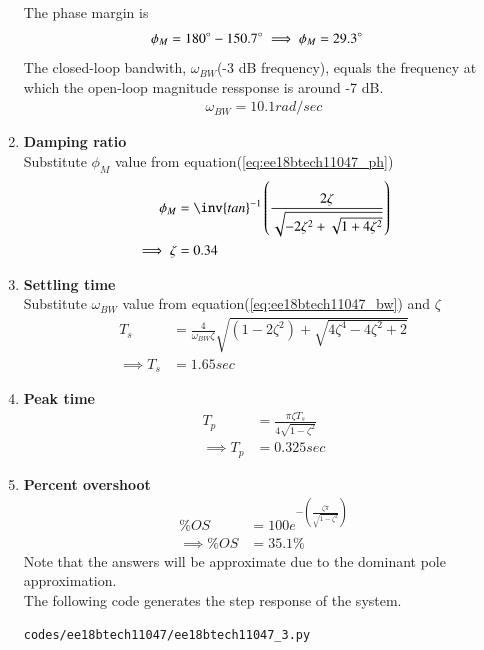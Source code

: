 \begin{enumerate}[label=\thesubsection.\arabic*.,ref=\thesubsection.\theenumi]
The phase margin is 
\begin{align}
\phi_{M} &= 180\degree-150.7\degree \implies \phi_{M} = 29.3\degree \label{eq:ee18btech11047_ph}
\end{align}
The closed-loop bandwith, $\omega_{BW}$(-3 dB frequency), equals the frequency at which the open-loop magnitude ressponse is around -7 dB.
\begin{align}
\omega_{BW} = 10.1  rad/sec \label{eq:ee18btech11047_bw}
\end{align}
\item \textbf{Damping ratio} \\
Substitute $\phi_{M}$ value from equation(\ref{eq:ee18btech11047_ph})
\begin{align}
\phi_{M} &= \inv{tan}^{-1}\brak{\frac{2\zeta}{\sqrt{-2\zeta^{2}+\sqrt{1+4\zeta^{2}}}}}\\
\implies \zeta &= 0.34
\end{align}
\item \textbf{Settling time} \\
Substitute $\omega_{BW}$ value from equation(\ref{eq:ee18btech11047_bw}) and $\zeta$
\begin{align}
T_{s}&= \frac{4}{\omega_{BW}\zeta}\sqrt{(1-2\zeta^2)+\sqrt{4\zeta^4-4\zeta^2+2}}\\
\implies T_{s} &= 1.65 sec   
\end{align}
\item \textbf{Peak time} \\
\begin{align}
T_{p} &= \frac{\pi\zeta T_{s}}{4\sqrt{1-\zeta^2}}\\
\implies T_{p} &= 0.325 sec
\end{align}
\item \textbf{Percent overshoot}
\begin{align}
\% OS&=100e^{-(\frac{\zeta\pi}{\sqrt{1-\zeta^2}})}\\
\implies \% OS &= 35.1 \%
\end{align}
Note that the answers will be approximate due to the dominant pole approximation.\\
The following code generates the step response of the system.
\begin{lstlisting}
codes/ee18btech11047/ee18btech11047_3.py
\end{lstlisting}
\begin{figure}[!ht]
\centering

\end{figure}
\end{enumerate}
